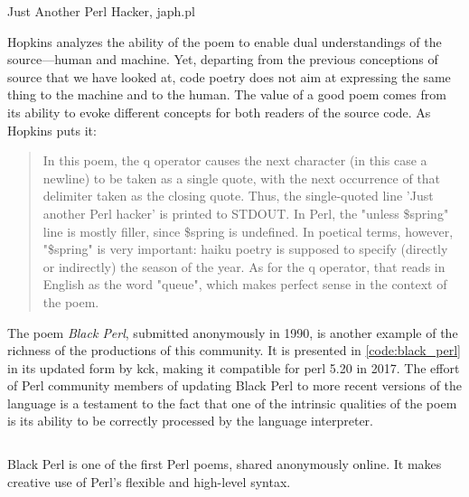 \begin{listing}
  \inputminted{perl}{./corpus/japh.pl}
  \caption{Just Another Perl Hacker, japh.pl}
  \label{code:japh_perl}
\end{listing}

Hopkins analyzes the ability of the poem to enable dual understandings of the source—human and machine. Yet, departing from the previous conceptions of source that we have looked at, code poetry does not aim at expressing the same thing to the machine and to the human. The value of a good poem comes from its ability to evoke different concepts for both readers of the source code. As Hopkins puts it:

\begin{quote}
  In this poem, the q operator causes the next character (in this case a newline) to be taken as a single quote, with the next occurrence of that delimiter taken as the closing quote. Thus, the single-quoted line 'Just another Perl hacker' is printed to STDOUT. In Perl, the "unless \$spring" line is mostly filler, since \$spring is undefined. In poetical terms, however, "\$spring" is very important: haiku poetry is supposed to specify (directly or indirectly) the season of the year. As for the q operator, that reads in English as the word "queue", which makes perfect sense in the context of the poem. \citep{hopkins_camels_1992}
\end{quote}

The poem \emph{Black Perl}, submitted anonymously in 1990, is another example of the richness of the productions of this community. It is presented in \ref{code:black_perl} in its updated form by kck, making it compatible for perl 5.20 in 2017. The effort of Perl community members of updating Black Perl to more recent versions of the language is a testament to the fact that one of the intrinsic qualities of the poem is its ability to be correctly processed by the language interpreter.

\begin{listing}
  \inputminted{perl}{./corpus/black_perl.pl}
  \caption{Black Perl is one of the first Perl poems, shared anonymously online. It makes creative use of Perl's flexible and high-level syntax.}
  \label{code:black_perl}
\end{listing}

